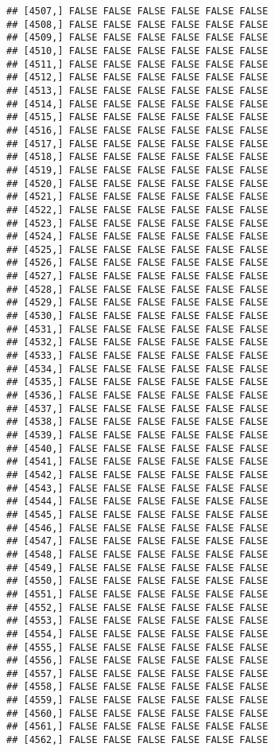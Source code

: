 \documentclass[
]{article}
\begin{document}
\begin{verbatim}
## [4507,] FALSE FALSE FALSE FALSE FALSE FALSE
## [4508,] FALSE FALSE FALSE FALSE FALSE FALSE
## [4509,] FALSE FALSE FALSE FALSE FALSE FALSE
## [4510,] FALSE FALSE FALSE FALSE FALSE FALSE
## [4511,] FALSE FALSE FALSE FALSE FALSE FALSE
## [4512,] FALSE FALSE FALSE FALSE FALSE FALSE
## [4513,] FALSE FALSE FALSE FALSE FALSE FALSE
## [4514,] FALSE FALSE FALSE FALSE FALSE FALSE
## [4515,] FALSE FALSE FALSE FALSE FALSE FALSE
## [4516,] FALSE FALSE FALSE FALSE FALSE FALSE
## [4517,] FALSE FALSE FALSE FALSE FALSE FALSE
## [4518,] FALSE FALSE FALSE FALSE FALSE FALSE
## [4519,] FALSE FALSE FALSE FALSE FALSE FALSE
## [4520,] FALSE FALSE FALSE FALSE FALSE FALSE
## [4521,] FALSE FALSE FALSE FALSE FALSE FALSE
## [4522,] FALSE FALSE FALSE FALSE FALSE FALSE
## [4523,] FALSE FALSE FALSE FALSE FALSE FALSE
## [4524,] FALSE FALSE FALSE FALSE FALSE FALSE
## [4525,] FALSE FALSE FALSE FALSE FALSE FALSE
## [4526,] FALSE FALSE FALSE FALSE FALSE FALSE
## [4527,] FALSE FALSE FALSE FALSE FALSE FALSE
## [4528,] FALSE FALSE FALSE FALSE FALSE FALSE
## [4529,] FALSE FALSE FALSE FALSE FALSE FALSE
## [4530,] FALSE FALSE FALSE FALSE FALSE FALSE
## [4531,] FALSE FALSE FALSE FALSE FALSE FALSE
## [4532,] FALSE FALSE FALSE FALSE FALSE FALSE
## [4533,] FALSE FALSE FALSE FALSE FALSE FALSE
## [4534,] FALSE FALSE FALSE FALSE FALSE FALSE
## [4535,] FALSE FALSE FALSE FALSE FALSE FALSE
## [4536,] FALSE FALSE FALSE FALSE FALSE FALSE
## [4537,] FALSE FALSE FALSE FALSE FALSE FALSE
## [4538,] FALSE FALSE FALSE FALSE FALSE FALSE
## [4539,] FALSE FALSE FALSE FALSE FALSE FALSE
## [4540,] FALSE FALSE FALSE FALSE FALSE FALSE
## [4541,] FALSE FALSE FALSE FALSE FALSE FALSE
## [4542,] FALSE FALSE FALSE FALSE FALSE FALSE
## [4543,] FALSE FALSE FALSE FALSE FALSE FALSE
## [4544,] FALSE FALSE FALSE FALSE FALSE FALSE
## [4545,] FALSE FALSE FALSE FALSE FALSE FALSE
## [4546,] FALSE FALSE FALSE FALSE FALSE FALSE
## [4547,] FALSE FALSE FALSE FALSE FALSE FALSE
## [4548,] FALSE FALSE FALSE FALSE FALSE FALSE
## [4549,] FALSE FALSE FALSE FALSE FALSE FALSE
## [4550,] FALSE FALSE FALSE FALSE FALSE FALSE
## [4551,] FALSE FALSE FALSE FALSE FALSE FALSE
## [4552,] FALSE FALSE FALSE FALSE FALSE FALSE
## [4553,] FALSE FALSE FALSE FALSE FALSE FALSE
## [4554,] FALSE FALSE FALSE FALSE FALSE FALSE
## [4555,] FALSE FALSE FALSE FALSE FALSE FALSE
## [4556,] FALSE FALSE FALSE FALSE FALSE FALSE
## [4557,] FALSE FALSE FALSE FALSE FALSE FALSE
## [4558,] FALSE FALSE FALSE FALSE FALSE FALSE
## [4559,] FALSE FALSE FALSE FALSE FALSE FALSE
## [4560,] FALSE FALSE FALSE FALSE FALSE FALSE
## [4561,] FALSE FALSE FALSE FALSE FALSE FALSE
## [4562,] FALSE FALSE FALSE FALSE FALSE FALSE

\end{verbatim}
\end{document}
